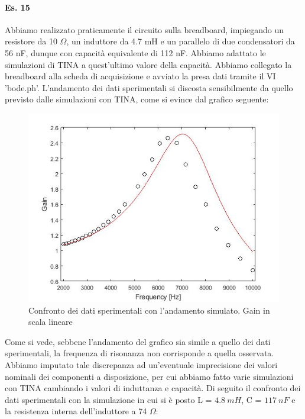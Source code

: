 \documentclass[journal, a4paper]{IEEEtran}
\begin{document}
\paragraph{Es. 15}
Abbiamo realizzato praticamente il circuito sulla breadboard, impiegando un resistore da 10 $\Omega$, un induttore da 4.7 mH e un parallelo di due condensatori da 56 nF, dunque con capacità equivalente di 112 nF. Abbiamo adattato le simulazioni di TINA a quest'ultimo valore della capacità. Abbiamo collegato la breadboard alla scheda di acquisizione e avviato la presa dati tramite il VI 'bode.ph'. L'andamento dei dati sperimentali si discosta sensibilmente da quello previsto dalle simulazioni con TINA, come si evince dal grafico seguente:

\begin{figure}[htp]
\centering
\includegraphics[scale=.34]{graph1}
\caption{Confronto dei dati sperimentali con l'andamento simulato. Gain in scala lineare}
\end{figure}

Come si vede, sebbene l'andamento del grafico sia simile a quello dei dati sperimentali, la frequenza di risonanza non corrisponde a quella osservata. Abbiamo imputato tale discrepanza ad un'eventuale imprecisione dei valori nominali dei componenti a disposizione, per cui abbiamo fatto varie simulazioni con TINA cambiando i valori di induttanza e capacità. Di seguito il confronto dei dati sperimentali con la simulazione in cui si è posto L = $4.8~mH$, C = $117 ~nF$ e la resistenza interna dell'induttore a 74 $\Omega$:
\end{document}
